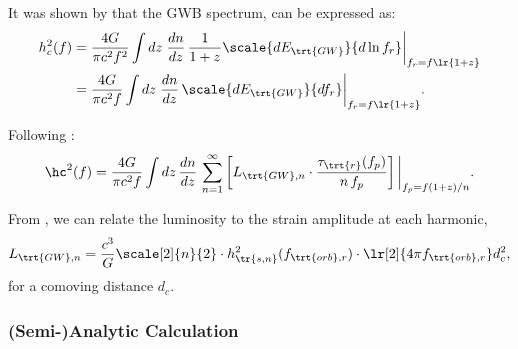 \documentclass[10pt, oneside, onecolumn]{article}   	%
\newcommand{\hsn}{h_\tr{s,n}}
\newcommand{\frstorb}{f_{\trt{orb},r}}
\newcommand{\lgwn}{L_{\trt{GW},n}}
\newcommand{\thard}{\tau_\trt{r}}
\begin{document}
            It was shown by \citet[][Eq.5]{Phinney-2001} that the GWB spectrum, can be expressed as:
            \begin{subequations}
            \begin{align}
                h_c^2(f)
                & = \frac{4G}{\pi c^2 f^2} \int dz \; \frac{dn}{dz} \, \frac{1}{1+z} \scale{dE_\trt{GW}}{d \ln f_r} \bigg|_{f_r=f\lr{1+z}} \\
                & = \frac{4G}{\pi c^2 f} \int dz \; \frac{dn}{dz} \, \scale{dE_\trt{GW}}{d f_r} \bigg|_{f_r=f\lr{1+z}}.
            \end{align}
            \end{subequations}

            Following \citet[][Eq.~3.5/10/11; or Eq.~\ref{eq:gw_energy_spectrum}~\&~\ref{eq:lum_gw} above]{enoki2007a}:
            \begin{equation}
                \label{eq:strain_spectrum_en07}
                \hc^2(f) = \frac{4G}{\pi c^2 f} \int dz \, \frac{dn}{dz} \,
                    \sum_{n=1}^\infty \left[ \lgwn \cdot \frac{\thard(f_p)}{n \, f_p} \right] \bigg|_{f_p = f(1+z)/n}.
            \end{equation}

            From \citet[][Eq.~2.1]{Finn+Thorne-2000}, we can relate the luminosity to the strain amplitude at each harmonic,
            \begin{equation}
                \label{eq:lum_to_strain}
                \lgwn = \frac{c^3}{G} \scale[2]{n}{2} \cdot \hsn^2(\frstorb) \cdot \lr[2]{4\pi \frstorb} d_c^2,
            \end{equation}
            for a comoving distance $d_c$.

            \subsubsection{(Semi-)Analytic Calculation}
\end{document}
